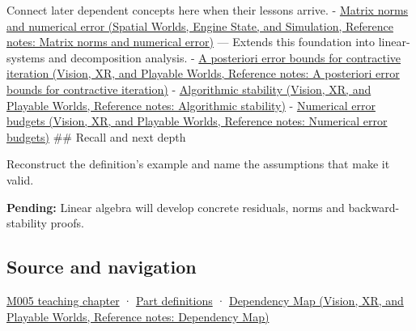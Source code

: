 Connect later dependent concepts here when their lessons arrive. - \href{../05-Spatial-Worlds-Engine-State-and-Simulation/main.pdf\#nameddest=appendix-f8657bac66e5}{Matrix norms and numerical error (Spatial Worlds, Engine State, and Simulation, Reference notes: Matrix norms and numerical error)} --- Extends this foundation into linear-systems and decomposition analysis. - \href{../07-Vision-XR-and-Playable-Worlds/main.pdf\#nameddest=appendix-d83b0ad1be7f}{A posteriori error bounds for contractive iteration (Vision, XR, and Playable Worlds, Reference notes: A posteriori error bounds for contractive iteration)} - \href{../07-Vision-XR-and-Playable-Worlds/main.pdf\#nameddest=appendix-aa2bf0d79639}{Algorithmic stability (Vision, XR, and Playable Worlds, Reference notes: Algorithmic stability)} - \href{../07-Vision-XR-and-Playable-Worlds/main.pdf\#nameddest=appendix-31b8c295e05f}{Numerical error budgets (Vision, XR, and Playable Worlds, Reference notes: Numerical error budgets)} \#\# Recall and next depth

Reconstruct the definition's example and name the assumptions that make it valid.

\textbf{Pending:} Linear algebra will develop concrete residuals, norms and backward-stability proofs.

\subsection{Source and navigation}\label{appendix-a7fbaf6d1b1c-source-and-navigation}

\hyperref[01-foundations-i-ch001-when-arithmetic-meets-uncertainty]{M005 teaching chapter} · \hyperref[appendix-fd090d982a15-m005---parts-77-88]{Part definitions} · \href{../07-Vision-XR-and-Playable-Worlds/main.pdf\#nameddest=appendix-4ad47bdd269a}{Dependency Map (Vision, XR, and Playable Worlds, Reference notes: Dependency Map)}
